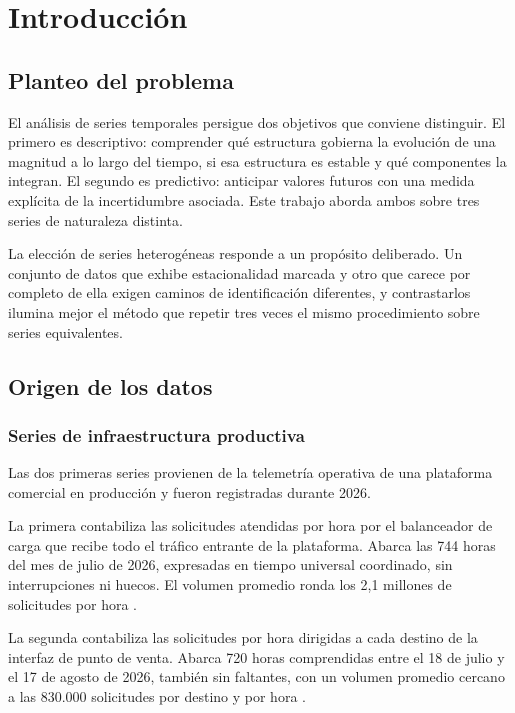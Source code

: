 \section{Introducción}

\subsection{Planteo del problema}

El análisis de series temporales persigue dos objetivos que conviene distinguir. El primero es
descriptivo: comprender qué estructura gobierna la evolución de una magnitud a lo largo del
tiempo, si esa estructura es estable y qué componentes la integran. El segundo es predictivo:
anticipar valores futuros con una medida explícita de la incertidumbre asociada. Este trabajo
aborda ambos sobre tres series de naturaleza distinta.

La elección de series heterogéneas responde a un propósito deliberado. Un conjunto de datos
que exhibe estacionalidad marcada y otro que carece por completo de ella exigen caminos de
identificación diferentes, y contrastarlos ilumina mejor el método que repetir tres veces el
mismo procedimiento sobre series equivalentes.

\subsection{Origen de los datos}

\subsubsection{Series de infraestructura productiva}

Las dos primeras series provienen de la telemetría operativa de una plataforma comercial en
producción y fueron registradas durante 2026.

La primera contabiliza las solicitudes atendidas por hora por el balanceador de carga que
recibe todo el tráfico entrante de la plataforma. Abarca las 744 horas del mes de julio de
2026, expresadas en tiempo universal coordinado, sin interrupciones ni huecos. El volumen promedio ronda los 2,1 millones de solicitudes por hora
\parencite{datos_alb}.

La segunda contabiliza las solicitudes por hora dirigidas a cada destino de la interfaz de
punto de venta. Abarca 720 horas comprendidas entre el 18 de julio y el 17 de agosto de 2026,
también sin faltantes, con un volumen promedio cercano a las 830.000 solicitudes por destino
y por hora \parencite{datos_pos}.

